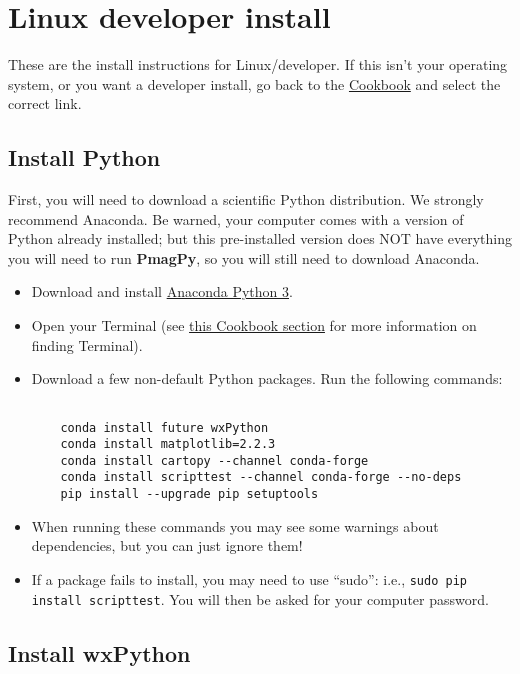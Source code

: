 \documentclass[11pt]{article}
\begin{document}
\tableofcontents

\section{Linux developer install}

These are the install instructions for Linux/developer.  If this isn't your operating system, or you want a developer install, go back to the \href{https://earthref.org/PmagPy/cookbook/#next_steps}{Cookbook} and select the correct link.

\subsection{Install Python}

First, you will need to download a scientific Python distribution.  We strongly recommend Anaconda.  Be warned, your computer comes with a version of Python already installed; but this pre-installed version does NOT have everything you will need to run {\bf PmagPy}, so you will still need to download Anaconda.

\begin{itemize}
   \item Download and install \href{https://www.anaconda.com/download}{Anaconda Python 3}.
   \item Open your Terminal (see \href{https://earthref.org/PmagPy/cookbook/#command_line}{this Cookbook section} for more information on finding Terminal).
   \item Download a few non-default Python packages.  Run the following commands: \begin{verbatim}

    conda install future wxPython
    conda install matplotlib=2.2.3
    conda install cartopy --channel conda-forge
    conda install scripttest --channel conda-forge --no-deps
    pip install --upgrade pip setuptools
\end{verbatim}
   \item When running these commands you may see some warnings about dependencies, but you can just ignore them!
\item If a package fails to install, you may need to use ``sudo'': i.e., \texttt{sudo pip install scripttest}.  You will then be asked for your computer password.

  \end{itemize}

\subsection{Install wxPython}
\end{document}
